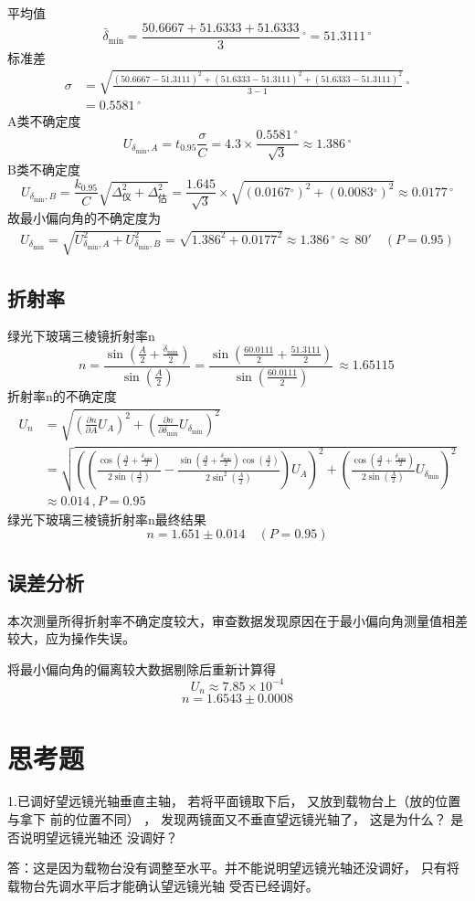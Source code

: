 \documentclass{article}
\begin{document}
平均值
$$
\bar{\delta}_{\min}=\frac{50.6667+51.6333+51.6333}{3}\,\mathrm{^{\circ}}=51.3111\,\mathrm{^{\circ}}
$$
标准差
$$
\begin{aligned}
\sigma&=\sqrt{\frac{(50.6667-51.3111)^2+(51.6333-51.3111)^2+(51.6333-51.3111)^2}{3-1}}\,\mathrm{^{\circ}}\\
&=0.5581\,\mathrm{^{\circ}}
\end{aligned}
$$
A类不确定度
\[U_{\delta_{\min},A}=t_{0.95}\frac{\sigma}{C}=4.3\times\frac{0.5581\,\mathrm{^{\circ}}}{\sqrt{3}}\approx1.386\,\mathrm{^{\circ}}\]
B类不确定度
$$
U_{{\delta}_{\min},B}=\frac{k_{0.95}}{C}\sqrt{\Delta_\text{仪}^2+\Delta_\text{估}^2}=\frac{1.645}{\sqrt{3}}\times\sqrt{(0.0167\mathrm{^{\circ}})^2+(0.0083\mathrm{^{\circ}})^2}\approx0.0177\,\mathrm{^{\circ}}
$$
故最小偏向角的不确定度为
$$
\begin{aligned}
U_{{\delta_{\min}}}=\sqrt{U_{\delta_{\min},A}^2+U_{\delta_{\min},B}^2}=\sqrt{1.386^2+0.0177^2}\approx1.386\,\mathrm{^{\circ}}\approx\,80'\quad(P=0.95)
\end{aligned}
$$
\subsection*{折射率}
绿光下玻璃三棱镜折射率n
$$
n=\frac{\sin{\left(\frac{A}{2} + \frac{\delta_{\min}}{2} \right)}}{\sin{\left(\frac{A}{2} \right)}}=\frac{\sin{\left(\frac{60.0111}{2}+\frac{51.3111}{2}\right)}}{\sin{\left(\frac{60.0111}{2}\right)}}\,\mathrm{}\approx1.65115\,\mathrm{}
$$
折射率n的不确定度
$$
\begin{aligned}
U_{n}&=\sqrt{\left(\frac{\partial n}{\partial A}U_{A}\right)^2+\left(\frac{\partial n}{\partial \delta_{\min}}U_{\delta_{\min}}\right)^2}\\
&=\sqrt{\left(\left(\frac{\cos{\left(\frac{A}{2} + \frac{\delta_{\min}}{2} \right)}}{2 \sin{\left(\frac{A}{2} \right)}} - \frac{\sin{\left(\frac{A}{2} + \frac{\delta_{\min}}{2} \right)} \cos{\left(\frac{A}{2} \right)}}{2 \sin^{2}{\left(\frac{A}{2} \right)}}\right)U_{A}\right)^2+\left(\frac{\cos{\left(\frac{A}{2} + \frac{\delta_{\min}}{2} \right)}}{2 \sin{\left(\frac{A}{2} \right)}}U_{\delta_{\min}}\right)^2}\\
&\approx0.014\,\mathrm{},P=0.95
\end{aligned}
$$
绿光下玻璃三棱镜折射率n最终结果
$$
n=1.651\pm0.014\quad (P=0.95) 
$$
\subsection*{误差分析}
本次测量所得折射率不确定度较大，审查数据发现原因在于最小偏向角测量值相差较大，应为操作失误。

将最小偏向角的偏离较大数据剔除后重新计算得 \[U_n\approx7.85\times 10^{-4}\]\[n=1.6543\pm 0.0008\]


\section*{思考题}
1.已调好望远镜光轴垂直主轴， 若将平面镜取下后， 又放到载物台上（放的位置与拿下
前的位置不同） ， 发现两镜面又不垂直望远镜光轴了， 这是为什么？ 是否说明望远镜光轴还
没调好？

答：这是因为载物台没有调整至水平。并不能说明望远镜光轴还没调好， 只有将载物台先调水平后才能确认望远镜光轴
受否已经调好。
\end{document}
